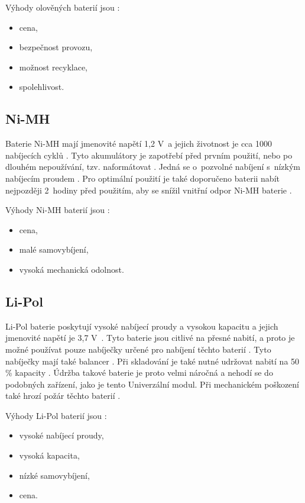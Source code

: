Výhody olověných baterií jsou \cite{olovene}:
\begin{itemize}
  \item cena,
  \item bezpečnost provozu,
  \item možnost recyklace,
  \item spolehlivost. 
\end{itemize}

\subsection{Ni-MH}
Baterie Ni-MH mají jmenovité napětí 1,2 V~a jejich životnost je cca 1000 nabíjecích cyklů \cite{akumulatory}. Tyto akumulátory je zapotřebí před prvním použití, nebo po 
dlouhém nepoužívání, tzv. naformátovat \cite{akumulatory}. 
Jedná se o~pozvolné nabíjení s~nízkým nabíjecím proudem \cite{akumulatory}. Pro optimální použití je také doporučeno baterii nabít nejpozději 2~hodiny před použitím, aby se 
snížil vnitřní odpor Ni-MH baterie \cite{akumulatory}.

Výhody Ni-MH baterií jsou \cite{akumulatory}:
\begin{itemize}
  \item cena,
  \item malé samovybíjení,
  \item vysoká mechanická odolnost.
\end{itemize}

\subsection{Li-Pol}
Li-Pol baterie poskytují vysoké nabíjecí proudy a vysokou kapacitu a jejich jmenovité napětí je 3,7 V~\cite{akumulatory}. Tyto baterie jsou citlivé na přesné nabití, a proto 
je možné používat pouze nabíječky určené pro nabíjení těchto baterií \cite{akumulatory}. Tyto nabíječky mají také balancer \cite{akumulatory}. Při skladování je také nutné 
udržovat nabití na 50 \% kapacity \cite{akumulatory}. Údržba takové baterie je proto velmi náročná a nehodí se do podobných zařízení, jako je tento Univerzální modul. Při 
mechanickém poškození také hrozí požár těchto baterií \cite{akumulatory}.

Výhody Li-Pol baterií jsou \cite{akumulatory}:
\begin{itemize}
  \item vysoké nabíjecí proudy, 
  \item vysoká kapacita, 
  \item nízké samovybíjení,
  \item cena.
\end{itemize}

